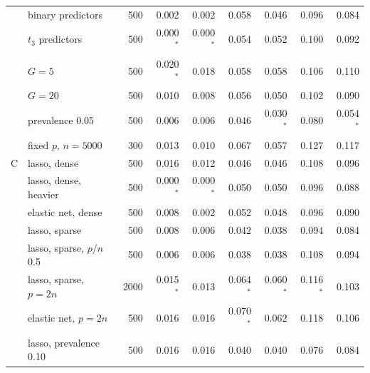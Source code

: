 \begin{tabular}{llrrrrrrr}
 & binary predictors & 500 & 0.002 & 0.002 & 0.058 & 0.046 & 0.096 & 0.084 \\
 & $t_3$ predictors & 500 & 0.000$^*$ & 0.000$^*$ & 0.054 & 0.052 & 0.100 & 0.092 \\
 & $G = 5$ & 500 & 0.020$^*$ & 0.018 & 0.058 & 0.058 & 0.106 & 0.110 \\
 & $G = 20$ & 500 & 0.010 & 0.008 & 0.056 & 0.050 & 0.102 & 0.090 \\
 & prevalence 0.05 & 500 & 0.006 & 0.006 & 0.046 & 0.030$^*$ & 0.080 & 0.054$^*$ \\
 & fixed $p$, $n = 5000$ & 300 & 0.013 & 0.010 & 0.067 & 0.057 & 0.127 & 0.117 \\
C & lasso, dense & 500 & 0.016 & 0.012 & 0.046 & 0.046 & 0.108 & 0.096 \\
 & lasso, dense, heavier & 500 & 0.000$^*$ & 0.000$^*$ & 0.050 & 0.050 & 0.096 & 0.088 \\
 & elastic net, dense & 500 & 0.008 & 0.002 & 0.052 & 0.048 & 0.096 & 0.090 \\
 & lasso, sparse & 500 & 0.008 & 0.006 & 0.042 & 0.038 & 0.094 & 0.084 \\
 & lasso, sparse, $p/n$ 0.5 & 500 & 0.006 & 0.006 & 0.038 & 0.038 & 0.108 & 0.094 \\
 & lasso, sparse, $p = 2n$ & 2000 & 0.015$^*$ & 0.013 & 0.064$^*$ & 0.060$^*$ & 0.116$^*$ & 0.103 \\
 & elastic net, $p = 2n$ & 500 & 0.016 & 0.016 & 0.070$^*$ & 0.062 & 0.118 & 0.106 \\
 & lasso, prevalence 0.10 & 500 & 0.016 & 0.016 & 0.040 & 0.040 & 0.076 & 0.084 \\
\bottomrule
\end{tabular}

